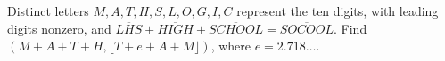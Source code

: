 Distinct letters $ M,A,T,H,S,L,O,G,I,C $ represent the ten digits, with leading digits nonzero, and $\overline{LHS}+\overline{HIGH}+\overline{SCHOOL}=\overline{SOCOOL}$. Find $(M+A+T+H,\lfloor T+e+A+M\rfloor)$, where $ e=2.718\ldots $.
